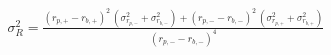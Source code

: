 


\begin{eqnarray*}
  \sigma_R^2 = \frac{\left( r_{p,+} - r_{b,+} \right)^2 \, 
		\left(\sigma_{r_{p,-}}^2 + \sigma_{r_{b,-}}^2 \right) +
             \left( r_{p,-} - r_{b,-} \right) ^2 \,
             \left( \sigma_{r_{p,+}}^2 + \sigma_{r_{b,+}}^2 \right)}
								     {\left( r_{p,-} - r_{b,-} \right) ^4}
\end{eqnarray*}

